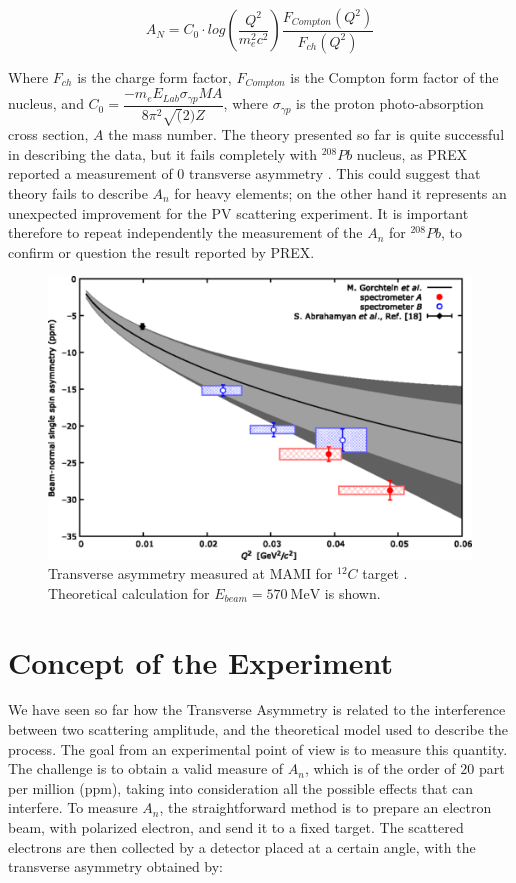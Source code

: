 \begin{equation}
A_{N} = C_{0} \cdot log(\dfrac{Q^{2}}{m_{e}^{2} c^{2}}) \dfrac{F_{Compton}(Q^{2})}{F_{ch}(Q^{2})}
\end{equation}

Where $F_{ch}$ is the charge form factor, $F_{Compton}$ is the Compton form factor of the nucleus, and $C_{0} = \dfrac{- m_{e} E_{Lab} \sigma_{\gamma p} M A}{8 \pi^{2} \sqrt(2) Z}$, where $\sigma_{\gamma p}$ is the proton photo-absorption cross section, $A$ the mass number. 
The theory presented so far is quite successful in describing the data, but it fails completely with $^{208}Pb$ nucleus, as PREX reported a measurement of $0$ transverse asymmetry \cite{HAPPEX:2012fud}. This could suggest that theory fails to describe $A_{n}$ for heavy elements; on the other hand it represents an unexpected improvement for the PV scattering experiment. It is important therefore to repeat independently the measurement of the $A_{n}$ for $^{208}Pb$, to confirm or question the result reported by PREX.

\begin{figure}[hbtp]
\centering
\includegraphics[scale = 0.5]{Transverse/medium.png}
\caption{Transverse asymmetry measured at MAMI for $^{12}C$ target \cite{Esser:2018vdp}. Theoretical calculation for $E_{beam} = \SI{570}{\mega \electronvolt}$  is shown.}
\end{figure}

\section{Concept of the Experiment}

We have seen so far how the Transverse Asymmetry is related to the interference between two scattering amplitude, and the theoretical model used to describe the process. The goal from an experimental point of view is to measure this quantity. The challenge is to obtain a valid measure of $A_{n}$, which is of the order of $20$ part per million (ppm), taking into consideration all the possible effects that can interfere. To measure $A_{n}$, the straightforward method is to prepare an electron beam, with polarized electron, and send it to a fixed target. The scattered electrons are then collected by a detector placed at a certain angle, with the transverse asymmetry obtained by:

